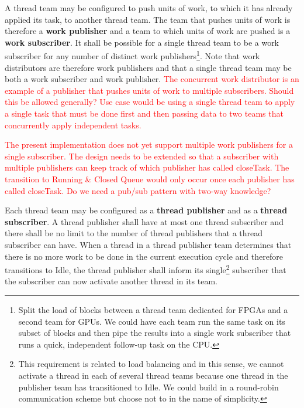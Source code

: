 \documentclass{article}
\begin{document}
\begin{req}
A thread team may be configured to push units of work, to which it has already
applied its task, to another thread team.  The team that pushes units of work is
therefore a \textbf{work publisher} and a team to which units of work are
pushed is a \textbf{work subscriber}.  It shall be possible for a single thread
team to be a work subscriber for any number of distinct work
publishers\footnote{Split the load of blocks between a thread team dedicated for
FPGAs and a second team for GPUs.  We could have each team run the same task on
its subset of blocks and then pipe the results into a single work subscriber
that runs a quick, independent follow-up task on the CPU.}.  Note that work
distributors are therefore work publishers and that a single thread team may be
both a work subscriber and work publisher.  \textcolor{red}{The concurrent work
distributor is an example of a publisher that pushes units of work to multiple
subscribers.  Should this be allowed generally?  Use case would be using a
single thread team to apply a single task that must be done first and then
passing data to two teams that concurrently apply independent tasks.}
\end{req}

\textcolor{red}{The present implementation does not yet support multiple work
publishers for a single subscriber.  The design needs to be extended so that
a subscriber with multiple publishers can keep track of which publisher has
called closeTask.  The transition to Running \& Closed Queue would only occur
once each publisher has called closeTask.  Do we need a pub/sub pattern with
two-way knowledge?}

\begin{req}
\label{req:ThreadSubPub}
Each thread team may be configured as a \textbf{thread publisher} and as a
\textbf{thread subscriber}.  A thread publisher shall have at most one thread
subscriber and there shall be no limit to the number of thread publishers that a
thread subscriber can have.  When a thread in a thread publisher team determines
that there is no more work to be done in the current execution cycle and
therefore transitions to Idle, the thread publisher shall inform its
single\footnote{This requirement is related to load balancing and in this sense,
we cannot activate a thread in each of several thread teams because one thread
in the publisher team has transitioned to Idle.  We could build in a round-robin communication
scheme but choose not to in the name of simplicity.} subscriber that the
subscriber can now activate another thread in its team.
\end{req}
\end{document}

